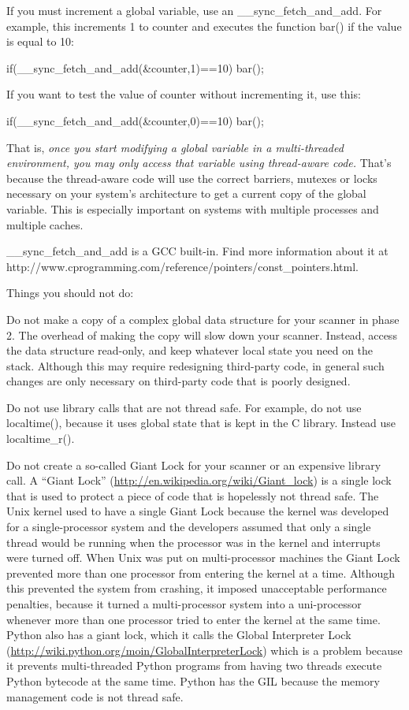If you must increment a global variable, use an
__sync_fetch_and_add. For example, this increments 1 to counter and
executes the function bar() if the value is equal to 10:

   if(__sync_fetch_and_add(&counter,1)==10){
     bar();
   }

If you want to test the value of counter without incrementing it, use
this:

   if(__sync_fetch_and_add(&counter,0)==10){
     bar();
   }

That is, \emph{once you start modifying a global variable in a
  multi-threaded environment, you may only access that variable using
  thread-aware code.} That's because the thread-aware code will
 use the correct barriers, mutexes or locks necessary on your system's
 architecture to get a current copy of the global variable. This is
 especially important on systems with multiple processes and multiple caches.

__sync_fetch_and_add is a GCC built-in. Find more information about it at
http://www.cprogramming.com/reference/pointers/const_pointers.html. 


Things you should not do:

Do not make a copy of a complex global data structure for your scanner
in phase 2. The overhead of making the copy will slow down  your
scanner. Instead, access the data structure read-only, and keep
whatever local state you need on the stack. Although this may require
redesigning third-party code, in general such changes are only
necessary on third-party code that is poorly designed.

Do not use library calls that are not thread safe. For example, do not
use localtime(), because it uses global state that is kept in the C
library. Instead use localtime_r().

Do not create a so-called Giant Lock for your scanner or an expensive library
call. A ``Giant Lock'' (\url{http://en.wikipedia.org/wiki/Giant_lock})
is a single lock that is used to protect a piece of code that is
hopelessly not thread safe. The Unix kernel used to have a single
Giant Lock because the kernel was developed for a single-processor
system and the developers assumed that only a single thread would be
running when the processor was in the kernel and interrupts were
turned off. When Unix was put on multi-processor machines the Giant
Lock prevented more than one processor from entering the kernel at a
time. Although this prevented the system from crashing, it imposed
unacceptable performance penalties, because it turned a
multi-processor system into a uni-processor whenever more than one
processor tried to enter the kernel at the same time.  Python also has
a giant lock, which it calls the Global Interpreter Lock
(\url{http://wiki.python.org/moin/GlobalInterpreterLock}) which is a
problem because it prevents multi-threaded Python programs from having
two threads execute Python bytecode at the same time. Python has the
GIL because the memory management code is not thread safe.

